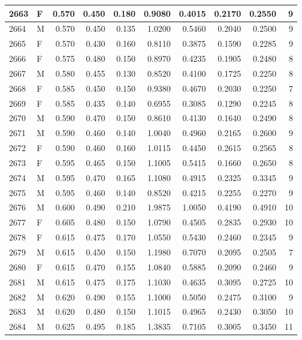 \documentclass[9pt,twocolumn,twoside,]{pnas-new}
\begin{document}
\begin{tabular}{l|l|r|r|r|r|r|r|r|r}
\hline
2663 & F & 0.570 & 0.450 & 0.180 & 0.9080 & 0.4015 & 0.2170 & 0.2550 & 9\\
\hline
2664 & M & 0.570 & 0.450 & 0.135 & 1.0200 & 0.5460 & 0.2040 & 0.2500 & 9\\
\hline
2665 & F & 0.570 & 0.430 & 0.160 & 0.8110 & 0.3875 & 0.1590 & 0.2285 & 9\\
\hline
2666 & F & 0.575 & 0.480 & 0.150 & 0.8970 & 0.4235 & 0.1905 & 0.2480 & 8\\
\hline
2667 & M & 0.580 & 0.455 & 0.130 & 0.8520 & 0.4100 & 0.1725 & 0.2250 & 8\\
\hline
2668 & F & 0.585 & 0.450 & 0.150 & 0.9380 & 0.4670 & 0.2030 & 0.2250 & 7\\
\hline
2669 & F & 0.585 & 0.435 & 0.140 & 0.6955 & 0.3085 & 0.1290 & 0.2245 & 8\\
\hline
2670 & M & 0.590 & 0.470 & 0.150 & 0.8610 & 0.4130 & 0.1640 & 0.2490 & 8\\
\hline
2671 & M & 0.590 & 0.460 & 0.140 & 1.0040 & 0.4960 & 0.2165 & 0.2600 & 9\\
\hline
2672 & F & 0.590 & 0.460 & 0.160 & 1.0115 & 0.4450 & 0.2615 & 0.2565 & 8\\
\hline
2673 & F & 0.595 & 0.465 & 0.150 & 1.1005 & 0.5415 & 0.1660 & 0.2650 & 8\\
\hline
2674 & M & 0.595 & 0.470 & 0.165 & 1.1080 & 0.4915 & 0.2325 & 0.3345 & 9\\
\hline
2675 & M & 0.595 & 0.460 & 0.140 & 0.8520 & 0.4215 & 0.2255 & 0.2270 & 9\\
\hline
2676 & M & 0.600 & 0.490 & 0.210 & 1.9875 & 1.0050 & 0.4190 & 0.4910 & 10\\
\hline
2677 & F & 0.605 & 0.480 & 0.150 & 1.0790 & 0.4505 & 0.2835 & 0.2930 & 10\\
\hline
2678 & F & 0.615 & 0.475 & 0.170 & 1.0550 & 0.5430 & 0.2460 & 0.2345 & 9\\
\hline
2679 & M & 0.615 & 0.450 & 0.150 & 1.1980 & 0.7070 & 0.2095 & 0.2505 & 7\\
\hline
2680 & F & 0.615 & 0.470 & 0.155 & 1.0840 & 0.5885 & 0.2090 & 0.2460 & 9\\
\hline
2681 & M & 0.615 & 0.475 & 0.175 & 1.1030 & 0.4635 & 0.3095 & 0.2725 & 10\\
\hline
2682 & M & 0.620 & 0.490 & 0.155 & 1.1000 & 0.5050 & 0.2475 & 0.3100 & 9\\
\hline
2683 & M & 0.620 & 0.480 & 0.150 & 1.1015 & 0.4965 & 0.2430 & 0.3050 & 10\\
\hline
2684 & M & 0.625 & 0.495 & 0.185 & 1.3835 & 0.7105 & 0.3005 & 0.3450 & 11\\

\end{tabular}
\end{document}
